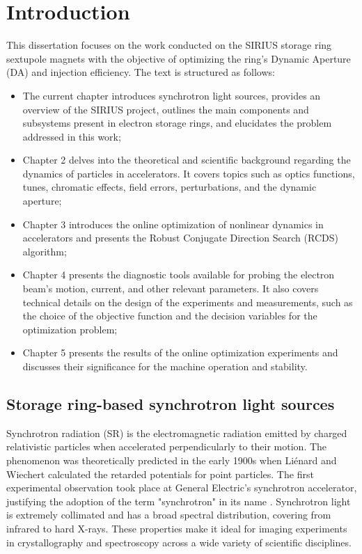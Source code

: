 \chapter*{Introduction}
This dissertation focuses on the work conducted on the SIRIUS storage ring sextupole magnets with the objective of optimizing the ring's Dynamic Aperture (DA) and injection efficiency. The text is structured as follows:
\begin{itemize}
    \item The current chapter introduces synchrotron light sources, provides an overview of the SIRIUS project, outlines the main components and subsystems present in electron storage rings, and elucidates the problem addressed in this work;
    \item Chapter 2 delves into the theoretical and scientific background regarding the dynamics of particles in accelerators. It covers topics such as optics functions, tunes, chromatic effects, field errors, perturbations, and the dynamic aperture;
    \item Chapter 3 introduces the online optimization of nonlinear dynamics in accelerators and presents the Robust Conjugate Direction Search (RCDS) algorithm;
    \item Chapter 4 presents the diagnostic tools available for probing the electron beam's motion, current, and other relevant parameters. It also covers technical details on the design of the experiments and measurements, such as the choice of the objective function and the decision variables for the optimization problem;
    \item Chapter 5 presents the results of the online optimization experiments and discusses their significance for the machine operation and stability.
\end{itemize}

\section*{Storage ring-based synchrotron light sources}

Synchrotron radiation (SR) is the electromagnetic radiation emitted by charged relativistic particles when accelerated perpendicularly to their motion. The phenomenon was theoretically predicted in the early 1900s when Liénard and Wiechert calculated the retarded potentials for point particles. The first experimental observation took place at General Electric's synchrotron accelerator, justifying the adoption of the term "synchrotron" in its name \cite{wiedemann_particle_2015}. Synchrotron light is extremely collimated and has a broad spectral distribution, covering from infrared to hard X-rays. These properties make it ideal for imaging experiments in crystallography and spectroscopy across a wide variety of scientific disciplines.

